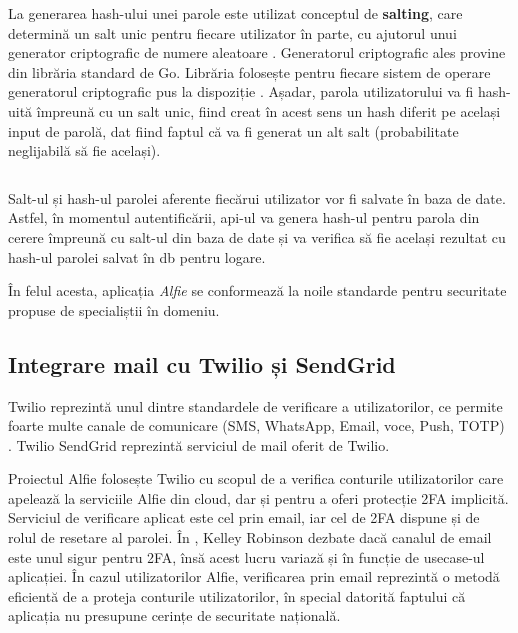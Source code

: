 La generarea hash-ului unei parole este utilizat conceptul de \textbf{salting}, care determină un salt unic pentru fiecare utilizator în parte, cu ajutorul unui generator criptografic de numere aleatoare \cite{goCryptographicRNG}. Generatorul criptografic ales provine din librăria standard de Go. Librăria folosește pentru fiecare sistem de operare generatorul criptografic pus la dispoziție \cite{goCryptographicRNG}. Așadar, parola utilizatorului va fi hash-uită împreună cu un salt unic, fiind creat în acest sens un hash diferit pe același input de parolă, dat fiind faptul că va fi generat un alt salt (probabilitate neglijabilă să fie același).

\begin{code}
    \inputminted[frame=single,framesep=2mm,linenos,breaklines,tabsize=2]{go}{code/generate-salt.go}
    \label{code:go_generate_salt}
\end{code}

Salt-ul și hash-ul parolei aferente fiecărui utilizator vor fi salvate în baza de date. Astfel, în momentul autentificării, api-ul va genera hash-ul pentru parola din cerere împreună cu salt-ul din baza de date și va verifica să fie același rezultat cu hash-ul parolei salvat în db pentru logare.

În felul acesta, aplicația \textit{Alfie} se conformează la noile standarde pentru securitate propuse de specialiștii în domeniu.

\subsection{Integrare mail cu Twilio și SendGrid}

Twilio reprezintă unul dintre standardele de verificare a utilizatorilor, ce permite foarte multe canale de comunicare (SMS, WhatsApp, Email, voce, Push, TOTP) \cite{twilioAuthChannels}. Twilio SendGrid reprezintă serviciul de mail oferit de Twilio.

Proiectul Alfie folosește Twilio cu scopul de a verifica conturile utilizatorilor care apelează la serviciile Alfie din cloud, dar și pentru a oferi protecție 2FA implicită. Serviciul de verificare aplicat este cel prin email, iar cel de 2FA dispune și de rolul de resetare al parolei. În \cite{twilioEmail2FATradeoffs}, Kelley Robinson dezbate dacă canalul de email este unul sigur pentru 2FA, însă acest lucru variază și în funcție de usecase-ul aplicației. În cazul utilizatorilor Alfie, verificarea prin email reprezintă o metodă eficientă de a proteja conturile utilizatorilor, în special datorită faptului că aplicația nu presupune cerințe de securitate națională.

